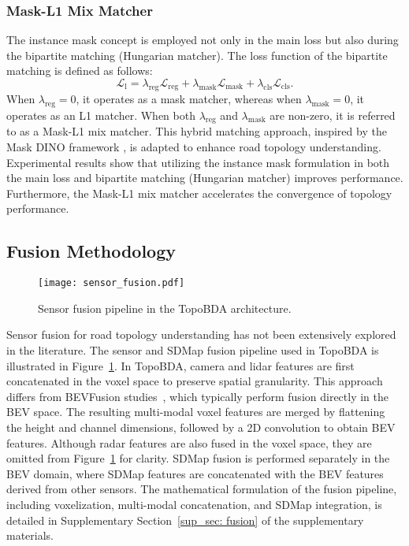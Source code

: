 \subsubsection{Mask-L1 Mix Matcher}

The instance mask concept is employed not only in the main loss but also during the bipartite matching (Hungarian matcher). The loss function of the bipartite matching is defined as follows:
\begin{equation}
\mathcal{L}_{\text{l}} = \lambda_{\text{reg}} \mathcal{L}_{\text{reg}} + \lambda_{\text{mask}} \mathcal{L}_{\text{mask}} + \lambda_{\text{cls}} \mathcal{L}_{\text{cls}}.
\end{equation}
When $\lambda_{\text{reg}} = 0$, it operates as a mask matcher, whereas when $\lambda_{\text{mask}} = 0$, it operates as an L1 matcher. When both $\lambda_{\text{reg}}$ and $\lambda_{\text{mask}}$ are non-zero, it is referred to as a Mask-L1 mix matcher. This hybrid matching approach, inspired by the Mask DINO framework \cite{li2023mask}, is adapted to enhance road topology understanding. Experimental results show that utilizing the instance mask formulation in both the main loss and bipartite matching (Hungarian matcher) improves performance. Furthermore, the Mask-L1 mix matcher accelerates the convergence of topology performance.


\subsection{Fusion Methodology}
\label{sec: fusion_methodology}

\begin{figure}[tb]
  \centering
  \texttt{[image: sensor\_fusion.pdf]}
  \caption{Sensor fusion pipeline in the TopoBDA architecture.}
  \label{fig: sensor_fusion}
\end{figure}

Sensor fusion for road topology understanding has not been extensively explored in the literature. The sensor and SDMap fusion pipeline used in TopoBDA is illustrated in Figure~\ref{fig: sensor_fusion}. In TopoBDA, camera and lidar features are first concatenated in the voxel space to preserve spatial granularity. This approach differs from BEVFusion studies~\cite{liang2022bevfusion, liu2023bevfusion, tang2023multi}, which typically perform fusion directly in the BEV space. The resulting multi-modal voxel features are merged by flattening the height and channel dimensions, followed by a 2D convolution to obtain BEV features. Although radar features are also fused in the voxel space, they are omitted from Figure~\ref{fig: sensor_fusion} for clarity. SDMap fusion is performed separately in the BEV domain, where SDMap features are concatenated with the BEV features derived from other sensors. The mathematical formulation of the fusion pipeline, including voxelization, multi-modal concatenation, and SDMap integration, is detailed in Supplementary Section~\ref{sup_sec: fusion} of the supplementary materials. 

